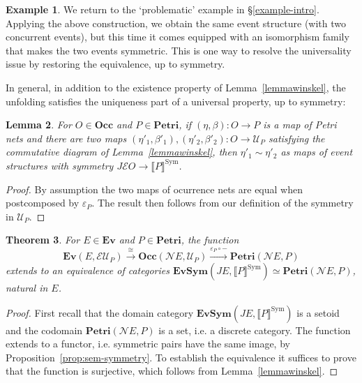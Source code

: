 \documentclass[11pt,a4paper]{article}
\theoremstyle{plain}
\newtheorem{theorem}{Theorem}[section]
\newtheorem{lemma}[theorem]{Lemma}
\theoremstyle{definition}
\newtheorem{example}[theorem]{Example}
\theoremstyle{remark}
\newcommand{\calN}{\mathcal{N}}
\newcommand{\calE}{\mathcal{E}}
\newcommand{\calJ}{J}
\newcommand{\calU}{\mathcal{U}}
\newcommand{\Occ}{\mathbf{Occ}}
\newcommand{\Petri}{\mathbf{Petri}}
\newcommand{\ES}{\mathbf{Ev}}
\newcommand{\SES}{\mathbf{EvSym}}
\newcommand{\semSA}[1]{\llbracket #1 \rrbracket^{\mathrm{Sym}}}
\begin{document}
	
	


    
    




\begin{example} We return to the `problematic' example in \S\ref{example-intro}. Applying the above construction, we obtain the same event structure (with two concurrent events), but this time it comes equipped with an isomorphism family that makes the two events symmetric. This is one way to resolve the universality issue by restoring the equivalence, up to symmetry. 
\end{example}

\def\x{2} 









  







In general, in addition to the existence property  of Lemma~\ref{lemmawinskel}, the unfolding satisfies the uniqueness part of a universal property, up to symmetry:
\begin{lemma}
\label{prop:crucial}
    For $O \in \Occ$ and $P \in \Petri$, if $(\eta, \beta): O \rightarrow P$ is a map of Petri nets and there are two maps $(\eta'_1, \beta'_1), (\eta'_2, \beta'_2):  O \rightarrow \calU_P$ satisfying the commutative diagram of Lemma~\ref{lemmawinskel}, 
then $\eta'_1 \sim \eta'_2$ as maps of event structures with symmetry $\calJ\calE O \to \semSA{P}$.
\end{lemma}
\begin{proof}
By assumption the two maps of ocurrence nets are equal when postcomposed by $\varepsilon_P$. The result then follows from our definition of the symmetry in $\calU_P$. 
\end{proof}


\begin{theorem}
\label{thm:pseudo-adj}
  For $E \in \ES$ and $P \in \Petri$, the function 
  \[ 
  \ES(E, \calE{\calU_P}) \xrightarrow{\cong} \Occ(\calN E, \calU_P) \xrightarrow{\varepsilon_P \circ -} \Petri(\calN E, P) 
  \]
extends to an equivalence of categories $\SES(JE, \semSA{P}) \simeq \Petri(\calN E, P)$, natural in $E$. 
\end{theorem}
\begin{proof}
First recall that the domain category $\SES(JE, \semSA{P})$ is a setoid and the codomain $\Petri(\calN E, P)$ is a set, i.e. a discrete category. The function extends to a functor, i.e. symmetric pairs have the same image, by Proposition~\ref{prop:sem-symmetry}. To establish the equivalence it suffices to prove that the function is surjective, which follows from Lemma~\ref{lemmawinskel}. 
\end{proof}
\end{document}

